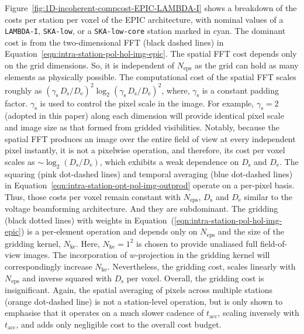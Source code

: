 \documentclass[
  journal=pasa,
  manuscript=article-type,
  year=2020,
  volume=37,
]{cup-journal}
\begin{document}
Figure~\ref{fig:1D-incoherent-compcost-EPIC-LAMBDA-I} shows a breakdown of the costs per station per voxel of the EPIC architecture, with nominal values of a \texttt{LAMBDA-I}, \texttt{SKA-low}, or a \texttt{SKA-low-core} station marked in cyan. The dominant cost is from the two-dimensional FFT (black dashed lines) in Equation~\ref{eqn:intra-station-pol-hol-img-epic}.
The spatial FFT cost depends only on the grid dimensions. So, it is independent of $N_\textrm{eps}$ as the grid can hold as many elements as physically possible. The computational cost of the spatial FFT scales roughly as $(\gamma_\textrm{s} \, D_\textrm{s}/D_\textrm{e})^2\log_2(\gamma_\textrm{s}\, D_\textrm{s}/D_\textrm{e})^2$, where, $\gamma_\textrm{s}$ is a constant padding factor. $\gamma_\textrm{s}$ is used to control the pixel scale in the image. For example, $\gamma_\textrm{s}=2$ (adopted in this paper) along each dimension will provide identical pixel scale and image size as that formed from gridded visibilities. Notably, because the spatial FFT produces an image over the entire field of view at every independent pixel instantly, it is not a pixelwise operation, and therefore, its cost per voxel scales as $\sim \log_2(D_\textrm{s}/D_\textrm{e})$, which exhibits a weak dependence on $D_\textrm{s}$ and $D_\textrm{e}$. The squaring (pink dot-dashed lines) and temporal averaging (blue dot-dashed lines) in Equation~\ref{eqn:intra-station-opt-pol-img-outprod} operate on a per-pixel basis. Thus, those costs per voxel remain constant with $N_\textrm{eps}$, $D_\textrm{s}$ and $D_\textrm{e}$ similar to the voltage beamforming architecture. And they 
are subdominant. The gridding (black dotted lines) with weights in Equation~(\ref{eqn:intra-station-pol-hol-img-epic})
is a per-element operation and depends only on $N_\textrm{eps}$ and the size of the gridding kernel, $N_\textrm{ke}$. Here, $N_\textrm{ke}=1^2$ is chosen to provide unaliased full field-of-view images. The incorporation of $w$-projection in the gridding kernel will correspondingly increase $N_\textrm{ke}$. Nevertheless, the gridding cost, scales linearly with $N_\textrm{eps}$ and inverse squared with $D_\textrm{s}$ per voxel. Overall, the gridding cost is insignificant. Again, the spatial averaging of pixels across multiple stations (orange dot-dashed line) is not a station-level operation, but is only shown to emphasise that it operates on a much slower cadence of $t_\textrm{acc}$, scaling inversely with $t_\textrm{acc}$, and adds only negligible cost to the overall cost budget. 
\end{document}
